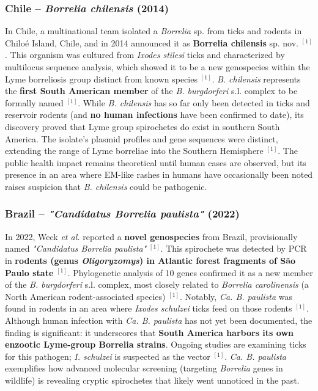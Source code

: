 \documentclass[11pt,letterpaper]{article}
\newcommand{\mycite}[1]{$^{[#1]}$}
\begin{document}
\subsubsection{Chile – \textit{Borrelia chilensis} (2014)}
In Chile, a multinational team isolated a \textit{Borrelia} sp. from ticks and rodents in Chiloé Island, Chile, and in 2014 announced it as \textbf{Borrelia chilensis} sp. nov. \mycite{1}. This organism was cultured from \textit{Ixodes stilesi} ticks and characterized by multilocus sequence analysis, which showed it to be a new genospecies within the Lyme borreliosis group distinct from known species \mycite{1}. \textit{B. chilensis} represents the \textbf{first South American member} of the \textit{B. burgdorferi} s.l. complex to be formally named \mycite{1}. While \textit{B. chilensis} has so far only been detected in ticks and reservoir rodents (and \textbf{no human infections} have been confirmed to date), its discovery proved that Lyme group spirochetes do exist in southern South America. The isolate's plasmid profiles and gene sequences were distinct, extending the range of Lyme borreliae into the Southern Hemisphere \mycite{1}. The public health impact remains theoretical until human cases are observed, but its presence in an area where EM-like rashes in humans have occasionally been noted raises suspicion that \textit{B. chilensis} could be pathogenic.

\subsubsection{Brazil – \textit{"Candidatus Borrelia paulista"} (2022)}
In 2022, Weck \textit{et al.} reported a \textbf{novel genospecies} from Brazil, provisionally named \textit{"Candidatus Borrelia paulista"} \mycite{1}. This spirochete was detected by PCR in \textbf{rodents (genus \textit{Oligoryzomys}) in Atlantic forest fragments of São Paulo state} \mycite{1}. Phylogenetic analysis of 10 genes confirmed it as a new member of the \textit{B. burgdorferi} s.l. complex, most closely related to \textit{Borrelia carolinensis} (a North American rodent-associated species) \mycite{1}. Notably, \textit{Ca. B. paulista} was found in rodents in an area where \textit{Ixodes schulzei} ticks feed on those rodents \mycite{1}. Although human infection with \textit{Ca. B. paulista} has not yet been documented, the finding is significant: it underscores that \textbf{South America harbors its own enzootic Lyme-group Borrelia strains}. Ongoing studies are examining ticks for this pathogen; \textit{I. schulzei} is suspected as the vector \mycite{1}. \textit{Ca. B. paulista} exemplifies how advanced molecular screening (targeting \textit{Borrelia} genes in wildlife) is revealing cryptic spirochetes that likely went unnoticed in the past.
\end{document}
